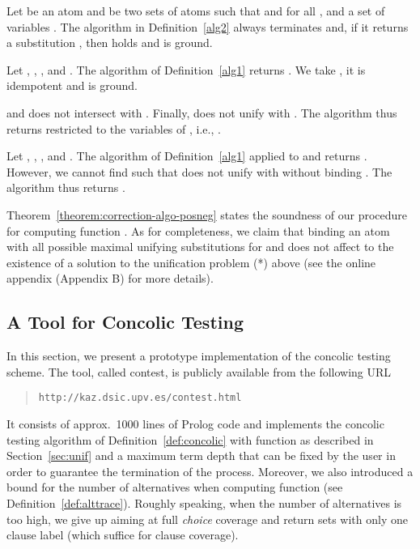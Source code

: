 \documentclass[fleqn]{tlp}
\begin{document}
\begin{theorem}\label{theorem:correction-algo-posneg}
  Let  be an atom and  be two sets of atoms such that
   and 
  for all , 
  and a set of variables .
  The algorithm in Definition~\ref{alg2} always terminates and, if it
  returns a substitution , then  holds and  is ground.
\end{theorem}

\begin{example}
  Let , , ,  
  and .
  The algorithm of Definition~\ref{alg1} 
  returns . 
  We take , it is idempotent and  
   is ground.
   
  and  does not intersect with .
  Finally,  does not unify with .
  The algorithm thus returns 
  restricted to the variables of , i.e., 
  .
\end{example}

\begin{example}
  Let , , 
  , and . 
  The algorithm of Definition~\ref{alg1}
  applied to  and  
  returns . 
  However, we cannot find  such that  does not
  unify with  without binding . 
  The algorithm thus returns .  
\end{example}
Theorem~\ref{theorem:correction-algo-posneg} states the soundness of our
procedure for computing function .
As for completeness, we claim that binding an atom  with all
possible maximal unifying substitutions for  and  does not
affect to the existence of a solution to the unification problem (*)
above
(see the online appendix (Appendix B) for more details).


\subsection{A Tool for Concolic Testing} \label{tool}

In this section, we present a prototype implementation of the
concolic testing scheme. The tool, called \textsf{contest}, is
publicly available from the following URL
\begin{quote}
  \texttt{http://kaz.dsic.upv.es/contest.html}
\end{quote}
It consists of approx.\ 1000 lines of Prolog code and implements the
concolic testing algorithm of Definition~\ref{def:concolic} with
function  as described in Section~\ref{sec:unif} and a maximum
term depth that can be fixed by the user in order to guarantee the
termination of the process. 
Moreover, we also introduced a bound for the number of alternatives
when computing function  (see
Definition~\ref{def:alttrace}). Roughly speaking, when the number of
alternatives is too high, we give up aiming at full \emph{choice}
coverage and return sets with only one clause label (which suffice for
clause coverage).
\end{document}
